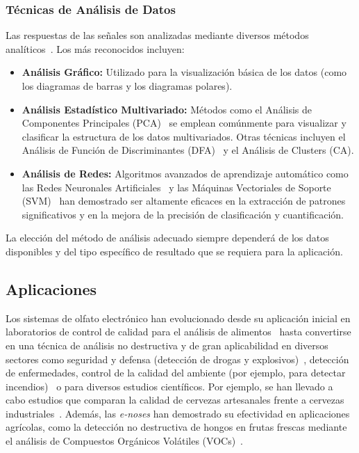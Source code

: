 \subsubsection{Técnicas de Análisis de Datos}
Las respuestas de las señales son analizadas mediante diversos métodos analíticos~\cite{MarcoGutierrez2012}. Los más reconocidos incluyen:
\begin{itemize}
    \item \textbf{Análisis Gráfico: }Utilizado para la visualización básica de los datos (como los diagramas de barras y los diagramas polares).
    \item \textbf{Análisis Estadístico Multivariado: }Métodos como el Análisis de Componentes Principales (PCA)~\cite{Jolliffe2016} se emplean comúnmente para visualizar y clasificar la estructura de los datos multivariados. Otras técnicas incluyen el Análisis de Función de Discriminantes (DFA)~\cite{AkbarEtAl2016} y el Análisis de Clusters (CA).
    \item \textbf{Análisis de Redes: }Algoritmos avanzados de aprendizaje automático como las Redes Neuronales Artificiales~\cite{HinesEtAl1999} y las Máquinas Vectoriales de Soporte (SVM)~\cite{PardoSberveglieri2005,ZhangEtAl2019} han demostrado ser altamente eficaces en la extracción de patrones significativos y en la mejora de la precisión de clasificación y cuantificación.
\end{itemize}
La elección del método de análisis adecuado siempre dependerá de los datos disponibles y del tipo específico de resultado que se requiera para la aplicación.

\subsection{Aplicaciones}
Los sistemas de olfato electrónico han evolucionado desde su aplicación inicial en laboratorios de control de calidad para el análisis de alimentos~\cite{BaldwinBaiPlotoDea2011} hasta convertirse en una técnica de análisis no destructiva y de gran aplicabilidad en diversos sectores como seguridad y defensa (detección de drogas y explosivos)~\cite{KarakayaUlucanTurkan2020}, detección de enfermedades, control de la calidad del ambiente (por ejemplo, para detectar incendios)~\cite{CapelliSironiDelRosso2014} o para diversos estudios científicos. Por ejemplo, se han llevado a cabo estudios que comparan la calidad de cervezas artesanales frente a cervezas industriales~\cite{RosalesEtAl2021}. Además, las \textit{e-noses} han demostrado su efectividad en aplicaciones agrícolas, como la detección no destructiva de hongos en frutas frescas mediante el análisis de Compuestos Orgánicos Volátiles (VOCs)~\cite{MartinezHernandezArroyo2025}.
\par

